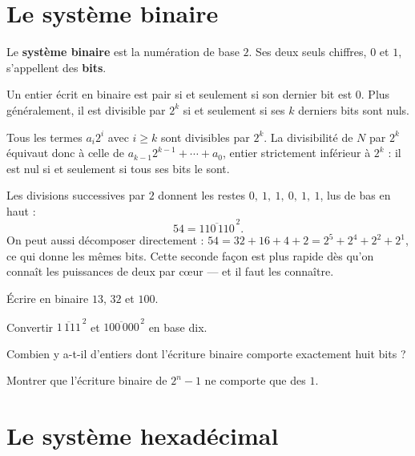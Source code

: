 \section{Le système binaire}

\begin{definition}
Le \textbf{système binaire} est la numération de base $2$. Ses deux seuls
chiffres, $0$ et $1$, s'appellent des \textbf{bits}.
\end{definition}

\begin{propriete}
Un entier écrit en binaire est pair si et seulement si son dernier bit est
$0$. Plus généralement, il est divisible par $2^{k}$ si et seulement si ses
$k$ derniers bits sont nuls.
\end{propriete}

\begin{demonstration}
Tous les termes $a_{i}2^{i}$ avec $i \geq k$ sont divisibles par $2^{k}$. La
divisibilité de $N$ par $2^{k}$ équivaut donc à celle de
$a_{k-1}2^{k-1}+\cdots+a_{0}$, entier strictement inférieur à $2^{k}$ : il est
nul si et seulement si tous ses bits le sont.
\end{demonstration}

\begin{exemple}
Les divisions successives par $2$ donnent les restes
$0,\ 1,\ 1,\ 0,\ 1,\ 1$, lus de bas en haut :
\[
  54 = \overline{110\,110}^{\,2}.
\]
On peut aussi décomposer directement : $54 = 32+16+4+2 = 2^{5}+2^{4}+2^{2}
+2^{1}$, ce qui donne les mêmes bits. Cette seconde façon est plus rapide dès
qu'on connaît les puissances de deux par cœur — et il faut les connaître.
\end{exemple}

\begin{entrainement}[binaire]
\exo[\niveau{1}] Écrire en binaire $13$, $32$ et $100$.

\exo[\niveau{1}] Convertir $\overline{1\,111}^{\,2}$ et
$\overline{100\,000}^{\,2}$ en base dix.

\exo[\niveau{2}] Combien y a-t-il d'entiers dont l'écriture binaire comporte
exactement huit bits ?

\exo[\niveau{3}] Montrer que l'écriture binaire de $2^{n}-1$ ne comporte que
des $1$.
\end{entrainement}

\section{Le système hexadécimal}

